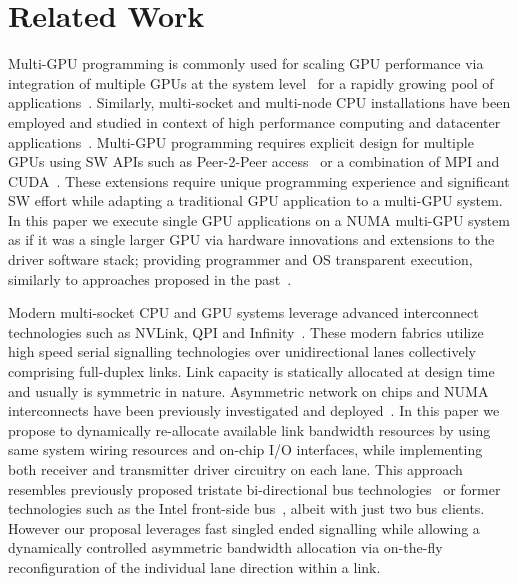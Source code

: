 \section{Related Work}
Multi-GPU programming is commonly used for scaling GPU performance via integration 
of multiple GPUs at the system 
level~\cite{pascal-tesla-wp,dgx,intersect360,titan_supercomputer} for a 
rapidly growing pool of 
applications~\cite{coral,cudnn,Lavin15b,SimonyanZ14a}. Similarly, 
multi-socket and multi-node CPU installations have been employed and studied 
in context of high performance computing and datacenter 
applications~\cite{Intel:Xeon,IBM:Power,IBM:z196,AMD:Opteron}.
Multi-GPU programming requires explicit design for multiple GPUs
using SW APIs such as Peer-2-Peer access~\cite{NVIDIAP2P} or a combination of
MPI and CUDA~\cite{NVIDIAMPI}. These extensions require
unique programming experience and significant SW effort while adapting a
traditional GPU application to a multi-GPU system. In this paper
we execute single GPU applications on a NUMA multi-GPU system as if it was a single
larger GPU via hardware innovations and extensions to the driver software stack;
providing programmer and OS transparent execution, similarly to approaches
proposed in the past~\cite{Cabezas2015,lee2013transparent,ben2015memory}.

Modern multi-socket CPU and GPU systems leverage advanced interconnect
technologies such as NVLink, QPI and
Infinity~\cite{dgx,INTELQPI,AMDINFINITYFABRIC}. These modern fabrics utilize
high speed serial signalling technologies over unidirectional lanes
collectively comprising full-duplex links. Link capacity is
statically allocated at design time and usually is symmetric in nature. Asymmetric
network on chips and NUMA interconnects have been previously investigated
and deployed~\cite{ziabari2015asymmetric, phillips2014m7}. In this
paper we propose to dynamically re-allocate available link bandwidth resources
by using same system wiring resources and on-chip I/O interfaces, while
implementing both receiver and transmitter driver circuitry on each lane. This
approach resembles previously proposed tristate bi-directional bus
technologies~\cite{tri-state} or former technologies such as the Intel front-side
bus~\cite{fsb}, albeit with just two bus clients. However our proposal leverages fast
singled ended signalling while allowing a dynamically controlled
asymmetric bandwidth allocation via on-the-fly reconfiguration of the
individual lane direction within a link.

